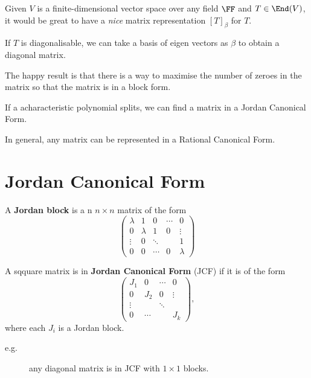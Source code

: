 \documentclass[11pt]{scrartcl}
\begin{document}
Given $V$ is a finite-dimensional vector space over any field $\FF$ and $T \in \End(V)$, it would be great to have a \textit{nice} matrix representation $[T]_{\beta}$ for $T$.

If $T$ is diagonalisable, we can take a basis of eigen vectors as
$\beta$ to obtain a diagonal matrix.

The happy result is that there is a way to maximise the number of
zeroes in the matrix so that the matrix is in a block form.

If a acharacteristic polynomial splits, we can find a matrix in a Jordan Canonical Form.

In general, any matrix can be represented in a Rational Canonical Form.

\section{Jordan Canonical Form}

\begin{definition}
  A \textbf{Jordan block} is a n $n\times n$ matrix of the form
  \begin{equation}
    \begin{pmatrix}
      \lambda & 1       & 0      & \cdots & 0      \\
      0       & \lambda & 1      & 0     & \vdots  \\
      \vdots  & 0       & \ddots &       & 1 \\
      0 & 0 & \cdots & 0 & \lambda
    \end{pmatrix}
  \end{equation}
\end{definition}

\begin{definition}
  A sqquare matrix is in \textbf{Jordan Canonical Form} (JCF) if it is of the form
  \begin{equation}
  \begin{pmatrix}
    J_1    & 0      & \cdots & 0      \\
    0      & J_2    & 0      & \vdots \\
    \vdots &        & \ddots &        \\
    0      & \cdots &        & J_k
  \end{pmatrix},
  \end{equation}
  where each $J_i$ is a Jordan block.
\end{definition}

\begin{description}

\item[e.g.] any diagonal matrix is in JCF with $1\times 1$ blocks.

\end{description}
\end{document}

